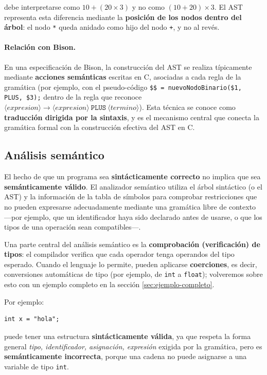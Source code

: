 \documentclass[11pt,a4paper]{article}
\begin{document}
debe interpretarse como $10 + (20 \times 3)$ y no como $(10+20)\times 3$. El AST representa esta
diferencia mediante la \textbf{posición de los nodos dentro del árbol}: el nodo \texttt{*}
queda anidado como hijo del nodo \texttt{+}, y no al revés.

\paragraph{Relación con Bison.} En una especificación de Bison, la construcción del AST se
realiza típicamente mediante \textbf{acciones semánticas} escritas en C, asociadas a cada regla
de la gramática (por ejemplo, con el pseudo-código \texttt{\$\$ = nuevoNodoBinario(\$1, PLUS,
\$3);} dentro de la regla que reconoce $\langle expresion \rangle \rightarrow \langle expresion
\rangle\ \texttt{PLUS}\ \langle termino \rangle$). Esta técnica se conoce como
\textbf{traducción dirigida por la sintaxis}, y es el mecanismo central que conecta la gramática
formal con la construcción efectiva del AST en C.

\subsection{Análisis semántico}
\label{sec:semantico}

El hecho de que un programa sea \textbf{sintácticamente correcto} no implica que sea
\textbf{semánticamente válido}. El analizador semántico utiliza el árbol sintáctico (o el AST)
y la información de la tabla de símbolos para comprobar restricciones que no pueden expresarse
adecuadamente mediante una gramática libre de contexto —por ejemplo, que un identificador haya
sido declarado antes de usarse, o que los tipos de una operación sean compatibles—.

Una parte central del análisis semántico es la \textbf{comprobación (verificación) de tipos}:
el compilador verifica que cada operador tenga operandos del tipo esperado. Cuando el lenguaje
lo permite, pueden aplicarse \textbf{coerciones}, es decir, conversiones automáticas de tipo
(por ejemplo, de \texttt{int} a \texttt{float}); volveremos sobre esto con un ejemplo completo
en la sección \ref{sec:ejemplo-completo}.

Por ejemplo:

\begin{lstlisting}
int x = "hola";
\end{lstlisting}

puede tener una estructura \textbf{sintácticamente válida}, ya que respeta la forma general
\textit{tipo, identificador, asignación, expresión} exigida por la gramática, pero es
\textbf{semánticamente incorrecta}, porque una cadena no puede asignarse a una variable de tipo
\texttt{int}.
\end{document}
